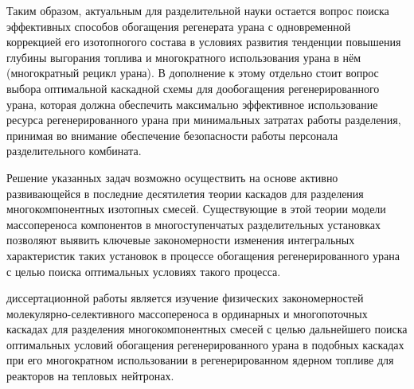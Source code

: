 Таким образом, актуальным для разделительной науки остается вопрос поиска эффективных способов обогащения регенерата урана с одновременной коррекцией его изотопногого состава в условиях развития тенденции повышения глубины выгорания топлива и многократного использования урана в нём (многократный рецикл урана). В дополнение к этому отдельно стоит вопрос выбора оптимальной каскадной схемы для дообогащения регенерированного урана, которая должна обеспечить максимально эффективное использование ресурса регенерированного урана при минимальных затратах работы разделения, принимая во внимание обеспечение безопасности работы персонала разделительного комбината.

Решение указанных задач возможно осуществить на основе активно развивающейся в последние десятилетия теории каскадов для разделения многокомпонентных изотопных смесей. Существующие в этой теории модели массопереноса компонентов в многоступенчатых разделительных установках позволяют выявить ключевые закономерности изменения интегральных характеристик таких установок в процессе обогащения регенерированного урана с целью поиска оптимальных условиях такого процесса.
 

{\aim} диссертационной работы является изучение физических закономерностей
молекулярно-селективного массопереноса в ординарных и многопоточных каскадах
для разделения многокомпонентных смесей с целью дальнейшего поиска
оптимальных условий обогащения регенерированного урана в подобных каскадах при
его многократном использовании в регенерированном ядерном топливе для реакторов на тепловых нейтронах. 

